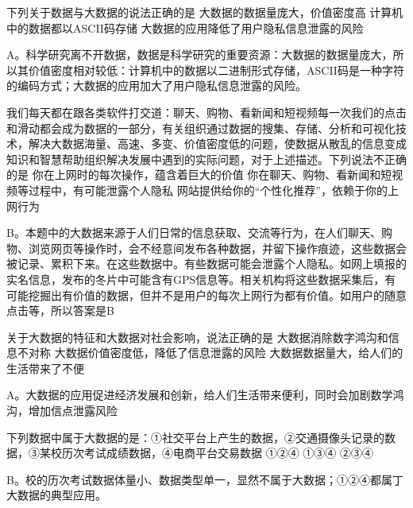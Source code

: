 \begin{groups}
\begin{questions}[rp]
\question
{}下列关于数据与大数据的说法正确的是
{大数据的数据量庞大，价值密度高}
{计算机中的数据都以ASCII码存储}
{大数据的应用降低了用户隐私信息泄露的风险}
\begin{solution}
A。科学研究离不开数据，数据是科学研究的重要资源：大数据的数据量庞大，所以其价值密度相对较低：计算机中的数据以二进制形式存储，ASCII码是一种字符的编码方式；大数据的应用加大了用户隐私信息泄露的风险。
\end{solution}

\question
{}我们每天都在跟各类软件打交道：聊天、购物、看新闻和短视频每一次我们的点击和滑动都会成为数据的一部分，有关组织通过数据的搜集、存储、分析和可视化技术，解决大数据海量、高速、多变、价值密度低的问题，使数据从散乱的信息变成知识和智慧帮助组织解决发展中遇到的实际问题，对于上述描述。下列说法不正确的是
{你在上网时的每次操作，蕴含着巨大的价值}
{你在聊天、购物、看新闻和短视频等过程中，有可能泄露个人隐私}
{网站提供给你的“个性化推荐”，依赖于你的上网行为}
\begin{solution}
B。本题中的大数据来源于人们日常的信息获取、交流等行为，在人们聊天、购物、浏览网页等操作时，会不经意间发布各种数据，并留下操作痕迹，这些数据会被记录、累积下来。在这些数据中。有些数据可能会泄露个人隐私。如网上填报的实名信息，发布的冬片中可能含有GPS信息等。相关机构将这些数据采集后，有可能挖掘出有价值的数据，但并不是用户的每次上网行为都有价值。如用户的随意点击等，所以答案是B
\end{solution}

\question
{}关于大数据的特征和大数据对社会影响，说法正确的是
{大数据消除数字鸿沟和信息不对称}
{大数据价值密度低，降低了信息泄露的风险}
{大数据数据量大，给人们的生活带来了不便}
\begin{solution}
A。大数据的应用促进经济发展和创新，给人们生活带来便利，同时会加剧数学鸿沟，增加信点泄露风险
\end{solution}

\question
{}下列数据中属于大数据的是：①社交平台上产生的数据，②交通摄像头记录的数据，③某校历次考试成绩数据，④电商平台交易数据
{①②④}
{①③④}
{②③④}
\begin{solution}
B。校的历次考试数据体量小、数据类型单一，显然不属于大数据；①②④都属丁大数据的典型应用。
\end{solution}


\end{questions}
\end{groups}
